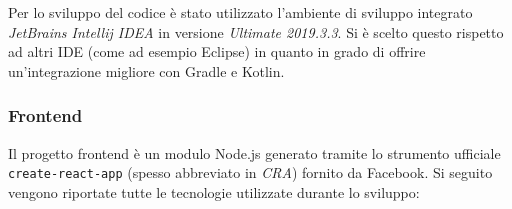       Per lo sviluppo del codice è stato utilizzato l'ambiente di sviluppo integrato \emph{JetBrains Intellij IDEA} in versione \emph{Ultimate 2019.3.3}.
      Si è scelto questo rispetto ad altri IDE (come ad esempio Eclipse) in quanto in grado di offrire un'integrazione migliore con Gradle e Kotlin.

    \subsubsection{Frontend}

      Il progetto frontend è un modulo Node.js generato tramite lo strumento ufficiale \texttt{create-react-app} (spesso abbreviato in \emph{CRA}) fornito da Facebook.
      Si seguito vengono riportate tutte le tecnologie utilizzate durante lo sviluppo:


